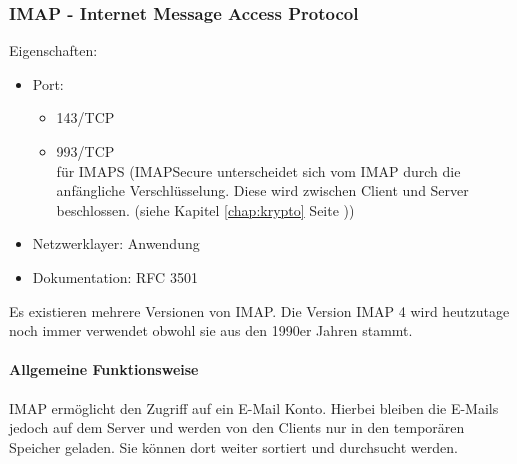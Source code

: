 \documentclass[12pt,a4paper]{report}
\begin{document}
\begin{onehalfspace}
\subsubsection{IMAP - Internet Message Access Protocol}
Eigenschaften:\\
\begin{itemize}
\item Port:
\begin{itemize}
\item 143/TCP
\item 993/TCP\\
für IMAPS (IMAPSecure unterscheidet sich vom IMAP durch die anfängliche Verschlüsselung. Diese wird zwischen Client und Server beschlossen. (siehe Kapitel \ref{chap:krypto} Seite \pageref{chap:krypto}))

\end{itemize}
\item Netzwerklayer: Anwendung
\item Dokumentation: RFC 3501
\end{itemize}
Es existieren mehrere Versionen von IMAP. Die Version IMAP 4 wird heutzutage noch immer verwendet obwohl sie aus den 1990er Jahren stammt. 
\paragraph{Allgemeine Funktionsweise\\}
IMAP ermöglicht den Zugriff auf ein E-Mail Konto. Hierbei bleiben die E-Mails jedoch auf dem Server und werden von den Clients nur in den temporären Speicher geladen. Sie können dort weiter sortiert und durchsucht werden. \\


\end{onehalfspace}
\end{document}

